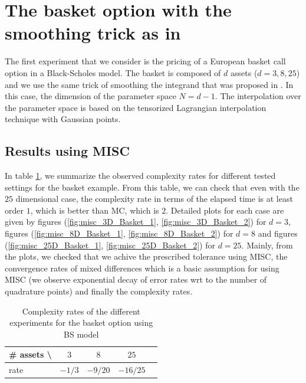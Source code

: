 \documentclass[11pt]{article}
\begin{document}
 \newpage

 


\appendix
\section{The basket option with the smoothing trick as in \cite{bayersmoothing}}\label{appendix:The basket option with smoothing trick with a time stepping procedure}

The first experiment that we consider is the pricing of  a European  basket call option in a Black-Scholes model. The basket is composed of $d$ assets ($d=3,8,25$) and we use the same trick of smoothing the integrand that was proposed in \cite{bayersmoothing}. In this case, the dimension of the parameter space $N=d-1$. The interpolation over the parameter space is based on the tensorized Lagrangian interpolation technique with Gaussian  points.


\subsection{Results using MISC}
In table \ref{table: Complexity rates of the different experiemnts  for the basket option using BS model}, we summarize the observed  complexity rates for different tested settings for the basket example. From this table, we can check that even with the $25$ dimensional case, the complexity rate in terms of the elapsed time is at least order $1$, which is better than MC, which is $2$. Detailed plots for each case are given by figures (\ref{fig:misc_3D_Basket_1}, \ref{fig:misc_3D_Basket_2}) for $d=3$, figures (\ref{fig:misc_8D_Basket_1}, \ref{fig:misc_8D_Basket_2}) for $d=8$ and figures (\ref{fig:misc_25D_Basket_1}, \ref{fig:misc_25D_Basket_2}) for $d=25$. Mainly, from the plots, 
we checked  that we achive the prescribed tolerance using MISC, the convergence rates of mixed differences which is a basic assumption for using MISC (we observe exponential decay of error rates wrt to the number of quadrature points) and finally the complexity rates.


\begin{table}[h!]
	\centering
	\begin{tabular}{l*{3}{c}r}
		\# assets  \textbackslash          & $3$ & $8$ & $25$   \\
		\hline
		rate   & $-1/3$ & $-9/20$ & $-16/25$  \\
		\hline
	\end{tabular}
	\caption{Complexity rates of the different experiments  for the basket option using BS model}
	\label{table: Complexity rates of the different experiemnts  for the basket option using BS model}
\end{table}	
\end{document}
